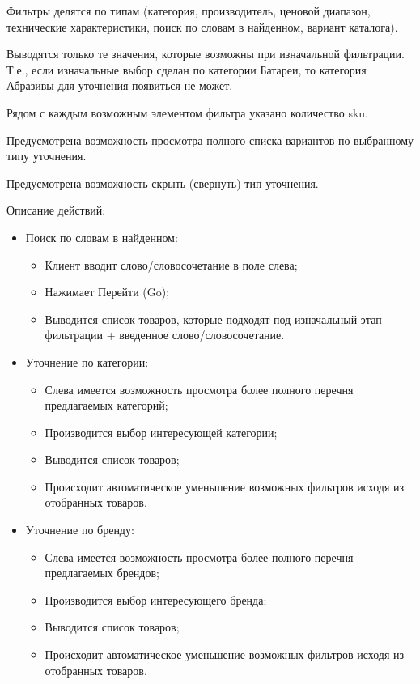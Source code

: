 {\begin{itogolong}
Фильтры делятся по типам (категория, производитель, ценовой диапазон, технические характеристики, поиск по словам в найденном, вариант каталога).

Выводятся только те значения, которые возможны при изначальной фильтрации. Т.е., если изначальные выбор сделан по категории Батареи, то категория Абразивы для уточнения появиться не может.

Рядом с каждым возможным элементом фильтра указано количество sku.

Предусмотрена возможность просмотра полного списка вариантов по выбранному типу уточнения.

Предусмотрена возможность скрыть (свернуть) тип уточнения.

Описание действий:
\begin{itemize}
\item Поиск по словам в найденном:
	\begin{itemize}
		\item Клиент вводит слово/словосочетание в поле слева;
		\item Нажимает Перейти (Go);
		\item Выводится список товаров, которые подходят под изначальный этап фильтрации + введенное слово/словосочетание.
	\end{itemize}

\item Уточнение по категории:
	\begin{itemize}
		\item Слева имеется возможность просмотра более полного перечня предлагаемых категорий;
		\item Производится выбор интересующей категории;
		\item Выводится список товаров;
		\item Происходит автоматическое уменьшение возможных фильтров исходя из отобранных товаров.
	\end{itemize}

\item Уточнение по бренду:

	\begin{itemize}
		\item Слева имеется возможность просмотра более полного перечня предлагаемых брендов;
		\item Производится выбор интересующего бренда;
		\item Выводится список товаров;
		\item Происходит автоматическое уменьшение возможных фильтров исходя из отобранных товаров.
	\end{itemize}


\end{itemize}
\end{itogolong}}
